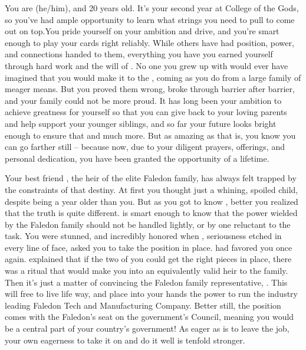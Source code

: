 \documentclass[char]{GL2020}
\begin{document}
\name{\cAmbition{}}

You are \cAmbition{\full} (he/him), and 20 years old. It's your second year at College of the Gods, so you've had ample opportunity to learn what strings you need to pull to come out on top.You pride yourself on your ambition and drive, and you're smart enough to play your cards right reliably. While others have had position, power, and connections handed to them, everything you have you earned yourself through hard work and the will of \cTechGod{}. No one you grew up with would ever have imagined that you would make it to the \pSchool{}, coming as you do from a large family of meager means. But you proved them wrong, broke through barrier after barrier, and your family could not be more proud. It has long been your ambition to achieve greatness for yourself so that you can give back to your loving parents and help support your younger siblings, and so far your future looks bright enough to ensure that and much more. But as amazing as that is, you know you can go farther still – because now, due to your diligent prayers, offerings, and personal dedication, you have been granted the opportunity of a lifetime.

Your best friend \cHeir{\full}, the heir of the elite Faledon family, has always felt trapped by the constraints of that destiny. At first you thought \cHeir{\they} \cHeir{\were} just a whining, spoiled child, despite being a year older than you. But as you got to know \cHeir{\them}, better you realized that the truth is quite different. \cHeir{} is smart enough to know that the power wielded by the Faledon family should not be handled lightly, or by one reluctant to the task. You were stunned, and incredibly honored when \cHeir{}, seriousness etched in every line of \cHeir{\their} face, asked you to take the position in \cHeir{\their} place. \cTechGod{} had favored you once again. \cHeir{} explained that if the two of you could get the right pieces in place, there was a ritual that would make you into an equivalently valid heir to the family. Then it's just a matter of convincing the Faledon family representative, \cDiplomat{\full}. This will free \cHeir{} to live life \cHeir{\their} way, and place into your hands the power to run the industry leading Faledon Tech and Manufacturing Company. Better still, the position comes with the Faledon's seat on the government's Council, meaning you would be a central part of your country's government! As eager as \cHeir{} is to leave the job, your own eagerness to take it on and do it well is tenfold stronger. 
\end{document}
